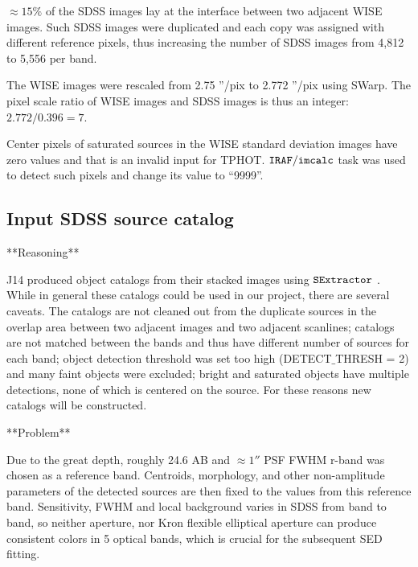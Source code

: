 \documentclass[numberedappendix,apj,twocolumn]{emulateapj}
\begin{document}
$\approx15\%$ of the SDSS images lay at the interface between two adjacent WISE images. Such SDSS images were duplicated and each copy was assigned with different reference pixels, thus increasing the number of SDSS images from 4,812 to 5,556 per band.

The WISE images were rescaled from 2.75 ''/pix to 2.772 ''/pix using SWarp. The pixel scale ratio of WISE images and SDSS images is thus an integer: $2.772/0.396 = 7$.

Center pixels of saturated sources in the WISE standard deviation images have zero values and that is an invalid input for TPHOT. $\tt IRAF/imcalc$ task was used to detect such pixels and change its value to ``9999''.


\subsection{Input SDSS source catalog} 
**Reasoning**

J14 produced object catalogs from their stacked images using $\tt SExtractor$ \citep[][]{Bertin1996}. While in general these catalogs could be used in our project, there are several caveats. The catalogs are not cleaned out from the duplicate sources in the overlap area between two adjacent images and two adjacent scanlines; catalogs are not matched between the bands and thus have different number of sources for each band; object detection threshold was set too high (DETECT$\_$THRESH = 2) and many faint objects were excluded; bright and saturated objects have multiple detections, none of which is centered on the source. For these reasons new catalogs will be constructed.

**Problem**

Due to the great depth, roughly 24.6 AB and $\approx1''$ PSF FWHM r-band was chosen as a reference band. Centroids, morphology, and other non-amplitude parameters of the detected sources are then fixed to the values from this reference band. Sensitivity, FWHM and local background varies in SDSS from band to band, so neither aperture, nor Kron flexible elliptical aperture \citep{Kron1980} can produce consistent colors in 5 optical bands, which is crucial for the subsequent SED fitting.
\end{document}
